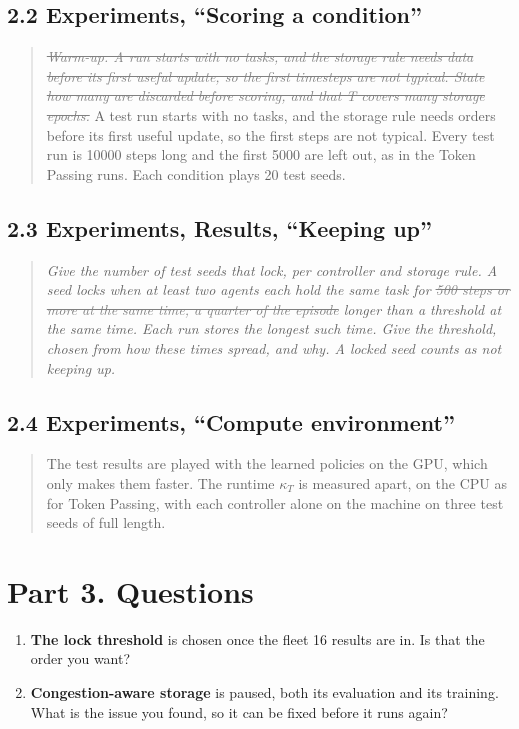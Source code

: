\documentclass[11pt,a4paper]{article}
\newcommand{\new}[1]{\textcolor{newc}{#1}}
\newcommand{\old}[1]{\textcolor{gray}{\st{#1}}}
\newcommand{\mockup}[1]{\textit{#1}}
\begin{document}
\subsection*{2.2 Experiments, ``Scoring a condition''}
\begin{quote}
\textit{\old{Warm-up. A run starts with no tasks, and the storage rule needs data before its first useful update, so the first timesteps are not typical. State how many are discarded before scoring, and that T covers many storage epochs.}}
\new{A test run starts with no tasks, and the storage rule needs orders before
its first useful update, so the first steps are not typical. Every test run is
10000 steps long and the first 5000 are left out, as in the Token Passing runs.
Each condition plays 20 test seeds.}
\end{quote}

\subsection*{2.3 Experiments, Results, ``Keeping up''}
\begin{quote}
\mockup{Give the number of test seeds that lock, per controller and storage
rule. A seed locks when at least two agents each hold the same task for
\old{500 steps or more at the same time, a quarter of the episode}
\new{longer than a threshold at the same time. Each run stores the longest
such time. Give the threshold, chosen from how these times spread, and why}.
A locked seed counts as not keeping up.}
\end{quote}

\subsection*{2.4 Experiments, ``Compute environment''}
\begin{quote}
\new{The test results are played with the learned policies on the GPU, which
only makes them faster. The runtime $\kappa_T$ is measured apart, on the CPU as
for Token Passing, with each controller alone on the machine on three test
seeds of full length.}
\end{quote}

\section*{Part 3. Questions}
\begin{enumerate}[leftmargin=1.4em]
\item \textbf{The lock threshold} is chosen once the fleet 16 results are in.
Is that the order you want?
\item \textbf{Congestion-aware storage} is paused, both its evaluation and
its training. What is the issue you found, so it can be fixed before it runs
again?
\end{enumerate}
\end{document}
